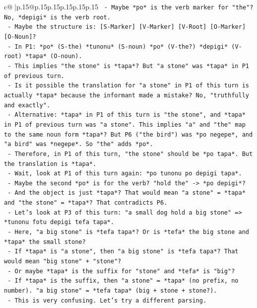 \documentclass{article}
\begin{document}
{\begin{supertabular}{c@{$\;$}|p{.15\linewidth}@{}p{.15\linewidth}p{.15\linewidth}p{.15\linewidth}p{.15\linewidth}p{.15\linewidth}}
{{{\texttt{      {-} Maybe *po* is the verb marker for "the"? No, *depigi* is the verb root.} \\
\texttt{      {-} Maybe the structure is: {[}S{-}Marker{]} {[}V{-}Marker{]} {[}V{-}Root{]} {[}O{-}Marker{]} {[}O{-}Noun{]}?} \\
\texttt{      {-} In P1: *po* (S{-}the) *tunonu* (S{-}noun) *po* (V{-}the?) *depigi* (V{-}root) *tapa* (O{-}noun).} \\
\texttt{      {-} This implies "the stone" is *tapa*? But "a stone" was *tapa* in P1 of previous turn.} \\
\texttt{      {-} Is it possible the translation for "a stone" in P1 of this turn is actually *tapa* because the informant made a mistake? No, "truthfully and exactly".} \\
\texttt{      {-} Alternative: *tapa* in P1 of this turn is "the stone", and *tapa* in P1 of previous turn was "a stone". This implies "a" and "the" map to the same noun form *tapa*? But P6 ("the bird") was *po negepe*, and "a bird" was *negepe*. So "the" adds *po*.} \\
\texttt{      {-} Therefore, in P1 of this turn, "the stone" should be *po tapa*. But the translation is *tapa*.} \\
\texttt{      {-} Wait, look at P1 of this turn again: *po tunonu po depigi tapa*.} \\
\texttt{      {-} Maybe the second *po* is for the verb? "hold the" {-}> *po depigi*?} \\
\texttt{      {-} And the object is just *tapa*? That would mean "a stone" = *tapa* and "the stone" = *tapa*? That contradicts P6.} \\
\texttt{      {-} Let's look at P3 of this turn: "a small dog hold a big stone" => *tunonu fotu depigi tefa tapa*.} \\
\texttt{        {-} Here, "a big stone" is *tefa tapa*? Or is *tefa* the big stone and *tapa* the small stone?} \\
\texttt{        {-} If *tapa* is "a stone", then "a big stone" is *tefa tapa*? That would mean "big stone" + "stone"?} \\
\texttt{        {-} Or maybe *tapa* is the suffix for "stone" and *tefa* is "big"?} \\
\texttt{        {-} If *tapa* is the suffix, then "a stone" = *tapa* (no prefix, no number). "a big stone" = *tefa tapa* (big + stone + stone?).} \\
\texttt{        {-} This is very confusing. Let's try a different parsing.} \\
}}}
\end{supertabular}}
\end{document}
